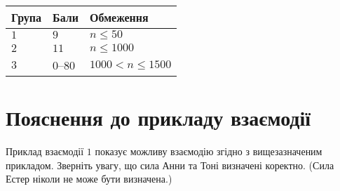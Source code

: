 \medskip
\begin{tabular}{lll}
Група & Бали & Обмеження \\\hline
$1$  &  $9$ & $n\leq 50$\\
$2$  &  $11$ & $n\leq 1000$\\
$3$  &  $0$--$80$ & $1000 < n\leq 1500$\\
\end{tabular}

\section*{Пояснення до прикладу взаємодії}

Приклад взаємодії $1$ показує можливу взаємодію згідно з вищезазначеним прикладом.
Зверніть увагу, що сила Анни та Тоні визначені коректно.
(Сила Естер ніколи не може бути визначена.)

